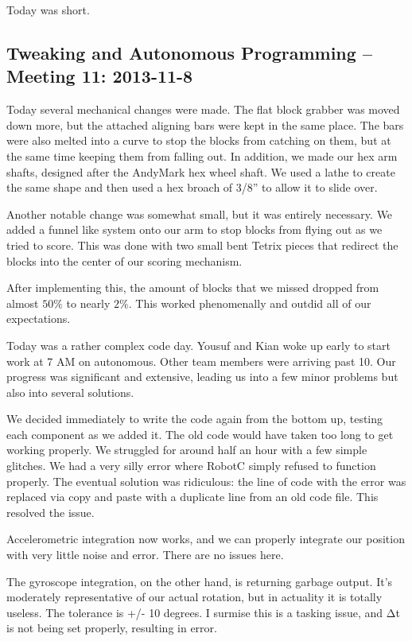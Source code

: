 Today was short.

\newpage \subsection{Tweaking and Autonomous Programming -- Meeting 11: 2013-11-8}
Today several mechanical changes were made. The flat block grabber was moved down more, but the attached aligning bars were kept in the same place. The bars were also melted into a curve to stop the blocks from catching on them, but at the same time keeping them from falling out. In addition, we made our hex arm shafts, designed after the AndyMark hex wheel shaft. We used a lathe to create the same shape and then used a hex broach of 3/8'' to allow it to slide over. 

Another notable change was somewhat small, but it was entirely necessary. We added a funnel like system onto our arm to stop blocks from flying out as we tried to score. This was done with two small bent Tetrix pieces that redirect the blocks into the center of our scoring mechanism. 

After implementing this, the amount of blocks that we missed dropped from almost $50\%$ to nearly $2\%$. This worked phenomenally and outdid all of our expectations. 

Today was a rather complex code day. Yousuf and Kian woke up early to start work at 7 AM on autonomous. Other team members were arriving past 10. Our progress was significant and extensive, leading us into a few minor problems but also into several solutions. 

We decided immediately to write the code again from the bottom up, testing each component as we added it. The old code would have taken too long to get working properly. We struggled for around half an hour with a few simple glitches. We had a very silly error where RobotC simply refused to function properly. The eventual solution was ridiculous: the line of code with the error was replaced via copy and paste with a duplicate line from an old code file. This resolved the issue. 

Accelerometric integration now works, and we can properly integrate our position with very little noise and error. There are no issues here. 

The gyroscope integration, on the other hand, is returning garbage output. It's moderately representative of our actual rotation, but in actuality it is totally useless. The tolerance is +/- 10 degrees. I surmise this is a tasking issue, and Δt is not being set properly, resulting in error. 

